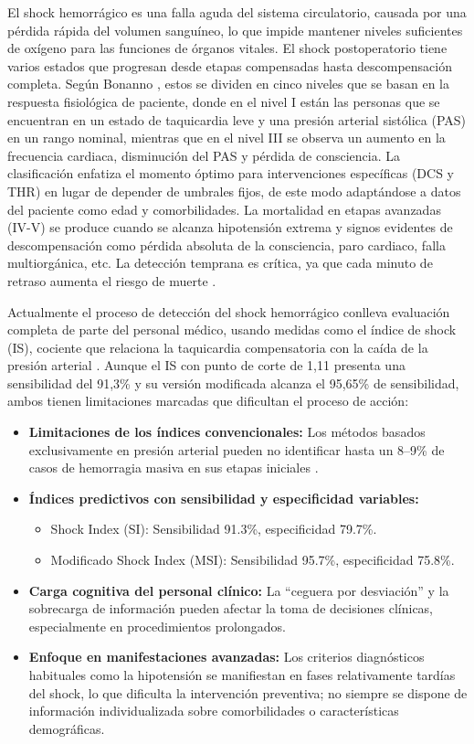 \documentclass[12pt, letterpaper]{article}
\begin{document}
El shock hemorrágico es una falla aguda del sistema circulatorio, causada por una pérdida rápida del volumen sanguíneo, lo que impide mantener niveles suficientes de oxígeno para las funciones de órganos vitales. El shock postoperatorio tiene varios estados que progresan desde etapas compensadas hasta descompensación completa. Según Bonanno \cite{bonanno2023}, estos se dividen en cinco niveles que se basan en la respuesta fisiológica de paciente, donde en el nivel I están las personas que se encuentran en un estado de taquicardia leve y una presión arterial sistólica (PAS) en un rango nominal, mientras que en el nivel III se observa un aumento en la frecuencia cardiaca, disminución del PAS y pérdida de consciencia. La clasificación enfatiza el momento óptimo para intervenciones específicas (DCS y THR) en lugar de depender de umbrales fijos, de este modo adaptándose a datos del paciente como edad y comorbilidades. La mortalidad en etapas avanzadas (IV-V) se produce cuando se alcanza hipotensión extrema y signos evidentes de descompensación como pérdida absoluta de la consciencia, paro cardiaco, falla multiorgánica, etc. La detección temprana es crítica, ya que cada minuto de retraso aumenta el riesgo de muerte \cite{cannon2018}.

Actualmente el proceso de detección del shock hemorrágico conlleva evaluación completa de parte del personal médico, usando medidas como el índice de shock (IS), cociente que relaciona la taquicardia compensatoria con la caída de la presión arterial \cite{terceros2017}. Aunque el IS con punto de corte de 1,11 presenta una sensibilidad del 91,3\% y su versión modificada alcanza el 95,65\% de sensibilidad, ambos tienen limitaciones marcadas que dificultan el proceso de acción:

\begin{itemize}
    \item \textbf{Limitaciones de los índices convencionales:} Los métodos basados exclusivamente en presión arterial pueden no identificar hasta un 8--9\% de casos de hemorragia masiva en sus etapas iniciales \cite{terceros2017}.
    \item \textbf{Índices predictivos con sensibilidad y especificidad variables:}
    \begin{itemize}
        \item Shock Index (SI): Sensibilidad 91.3\%, especificidad 79.7\%.
        \item Modificado Shock Index (MSI): Sensibilidad 95.7\%, especificidad 75.8\%.
    \end{itemize}
    \item \textbf{Carga cognitiva del personal clínico:} La ``ceguera por desviación'' y la sobrecarga de información pueden afectar la toma de decisiones clínicas, especialmente en procedimientos prolongados.
    \item \textbf{Enfoque en manifestaciones avanzadas:} Los criterios diagnósticos habituales como la hipotensión se manifiestan en fases relativamente tardías del shock, lo que dificulta la intervención preventiva; no siempre se dispone de información individualizada sobre comorbilidades o características demográficas.
\end{itemize}
\end{document}
